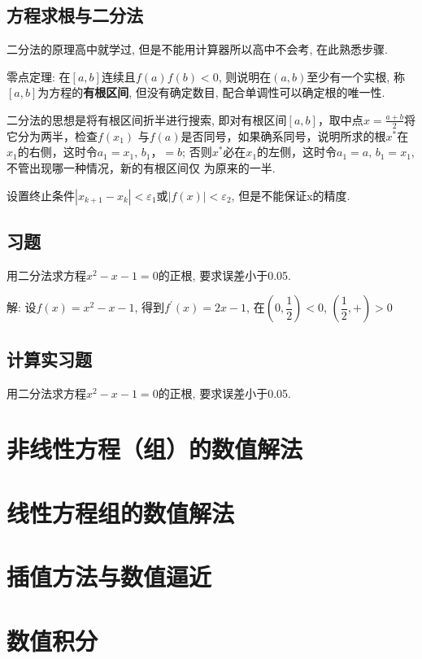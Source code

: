 \documentclass[lang=cn,newtx,12pt,scheme=chinese]{elegantbook}
\begin{document}
\section{方程求根与二分法}
二分法的原理高中就学过, 但是不能用计算器所以高中不会考, 在此熟悉步骤.

零点定理: 在$[a,b]$连续且$f(a)f(b)<0$, 则说明在$(a,b)$至少有一个实根, 称$[a,b]$为方程的\textbf{有根区间}, 但没有确定数目, 配合单调性可以确定根的唯一性. 



二分法的思想是将有根区间折半进行搜索, 即对有根区间$[a,b]$，取中点$x=\frac{a+b}{2}$将它分为两半，检查$f(x_1)$
与$f(a)$是否同号，如果确系同号，说明所求的根$x^*$在$x_1$的右侧，这时令$a_1=x_1,\,b_1，=b$; 否则$x^*$必在$x_1$的左侧，这时令$a_1=a,\,b_1=x_1$, 不管出现哪一种情况，新的有根区间仅
为原来的一半.


设置终止条件$|x_{k+1}-x_k|<\varepsilon_1$或$|f(x)|<\varepsilon_2$, 但是不能保证x的精度.
\section{习题}
\begin{exercise}
	用二分法求方程$x^2-x-1=0$的正根, 要求误差小于0.05.
\end{exercise}
解: 设$f(x)=x^2-x-1$, 得到$f^{'}(x)=2x-1$, 在$(0,\dfrac{1}{2})<0$, $(\dfrac{1}{2},+)>0$
\section{计算实习题}
\begin{exercise}
	用二分法求方程$x^2-x-1=0$的正根, 要求误差小于0.05.
\end{exercise}
\chapter{非线性方程（组）的数值解法}

\chapter{线性方程组的数值解法}

\chapter{插值方法与数值逼近}
\chapter{数值积分}
\end{document}
